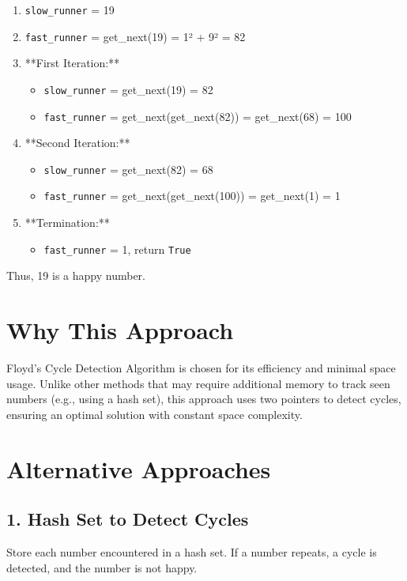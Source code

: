 \begin{enumerate}
    \item \texttt{slow\_runner} = 19
    \item \texttt{fast\_runner} = get\_next(19) = 1² + 9² = 82
    \item **First Iteration:**
    \begin{itemize}
        \item \texttt{slow\_runner} = get\_next(19) = 82
        \item \texttt{fast\_runner} = get\_next(get\_next(82)) = get\_next(68) = 100
    \end{itemize}
    \item **Second Iteration:**
    \begin{itemize}
        \item \texttt{slow\_runner} = get\_next(82) = 68
        \item \texttt{fast\_runner} = get\_next(get\_next(100)) = get\_next(1) = 1
    \end{itemize}
    \item **Termination:**
    \begin{itemize}
        \item \texttt{fast\_runner} = 1, return \texttt{True}
    \end{itemize}
\end{enumerate}

Thus, 19 is a happy number.

\section*{Why This Approach}

Floyd's Cycle Detection Algorithm is chosen for its efficiency and minimal space usage. Unlike other methods that may require additional memory to track seen numbers (e.g., using a hash set), this approach uses two pointers to detect cycles, ensuring an optimal solution with constant space complexity.

\section*{Alternative Approaches}

\subsection*{1. Hash Set to Detect Cycles}

Store each number encountered in a hash set. If a number repeats, a cycle is detected, and the number is not happy.

